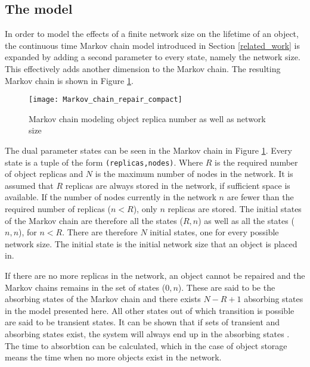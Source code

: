 \subsection{The model}
\label{model}

In order to model the effects of a finite network size on the lifetime of an object, the continuous time Markov chain model introduced in Section \ref{related_work} is expanded by adding a second parameter to every state, namely the network size. This effectively adds another dimension to the Markov chain. The resulting Markov chain is shown in Figure \ref{fig_markov_chain}.

\begin{figure}[htbp]
 \centering
 \texttt{[image: Markov\_chain\_repair\_compact]}
 \caption{Markov chain modeling object replica number as well as network size}
 \label{fig_markov_chain}
\end{figure}


The dual parameter states can be seen in the Markov chain in Figure \ref{fig_markov_chain}. Every state is a tuple of the form \verb.(replicas,nodes).. Where $R$ is the required number of object replicas and $N$ is the maximum number of nodes in the network. It is assumed that $R$ replicas are always stored in the network, if sufficient space is available. If the number of nodes currently in the network $n$ are fewer than the required number of replicas ($n < R$), only $n$ replicas are stored. The initial states of the Markov chain are therefore all the states ($R,n$) as well as all the states ($n,n$), for $n < R$. There are therefore $N$ initial states, one for every possible network size. The initial state is the initial network size that an object is placed in.

If there are no more replicas in the network, an object cannot be repaired and the Markov chains remains in the set of states ($0,n$). These are said to be the absorbing states of the Markov chain and there exists $N - R + 1$ absorbing states in the model presented here. All other states out of which transition is possible are said to be transient states. It can be shown that if sets of transient and absorbing states exist, the system will always end up in the absorbing states \cite{grinstead1997introduction_probability}. The time to absorbtion can be calculated, which in the case of object storage means the time when no more objects exist in the network.

